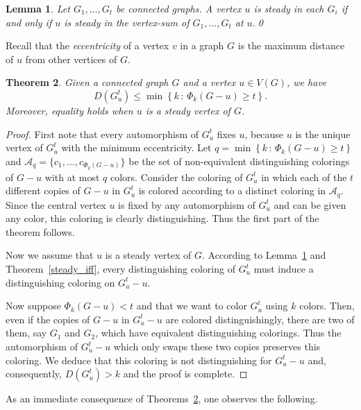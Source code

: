 \documentclass[12pt,a4paper, longbibliography]{article}
\newtheorem{theorem}{{\color{THM} Theorem}}[section]
\newtheorem{lemma}[theorem]{{\color{THM}Lemma}}
\theoremstyle{definition}
\numberwithin{equation}{section}
\begin{document}
	\begin{lemma}\label{steady_in_whole_vsum}
		Let $G_1, \ldots, G_t$ be connected graphs. A vertex $u$ is   steady   in each $G_i$ if and only if $u$ is steady in the vertex-sum of $G_1,\ldots,G_t$ at $u$.\qed
	\end{lemma}
	Recall that the \emph{eccentricity} of a vertex $v$ in  a graph $G$ is the maximum distance of $u$ from other vertices of $G$.
	
	\begin{theorem}\label{dvsum}
		Given a connected graph $G$ and a vertex $u\in V(G)$, we have
		\[D(G_u^t)\leq \min \left\{ k \,  : \, \Phi_k(G-u) \geq t \right\}. \] 
		Moreover, equality holds when $u$ is a steady vertex of $G$.
	\end{theorem}
	
	
	\begin{proof}
		First note that  every automorphism of $G_u^t$ fixes $u$, because $u$ is the unique vertex of $G_u^t$ with the minimum eccentricity. 
		Let $q=\min \left\{ k \,  : \, \Phi_k(G-u) \geq t \right\}$ and $\mathcal{A}_q = \{ c_1 , ... , c_{\Phi_{q}(G-u)}\} $ be the set of non-equivalent distinguishing colorings of $G-u$ with at most $q$ colors. Consider the coloring of  $G_u^t$ in which   each of the $t$ different copies of $G-u$ in $G_u^t$ is colored according to a distinct coloring in $\mathcal{A}_q$. Since the central vertex $u$ is fixed by any automorphism of $G_u^t$ and can be given any color, this coloring is clearly distinguishing. Thus the first part of the theorem follows. 
		
		Now  we assume that $u$ is a steady vertex of $G$. According to Lemma~\ref{steady_in_whole_vsum} and Theorem~\ref{steady_iff}, every distinguishing coloring of  $G_u^t$ must induce a distinguishing coloring  on  $G_u^t-u$.

		Now suppose    $ \Phi_k(G-u) < t $ and that  we want  to color $G_u^t$ using  $k$ colors. Then, even if the copies of $G-u$ in $G_u^t-u$ are  colored distinguishingly, there are two of them, say $G_1$ and $G_2$, which  have equivalent distinguishing colorings. Thus the automorphism of $G_u^t-u$ which only swaps these two copies preserves this coloring. We deduce  that this coloring is not distinguishing for $G_u^t-u$ and, consequently, $D(G_u^t)>k$ and the proof is complete.
	\end{proof}
	
	As an immediate consequence of Theorems~\ref{dvsum}, one observes the following.
	
\end{document}
